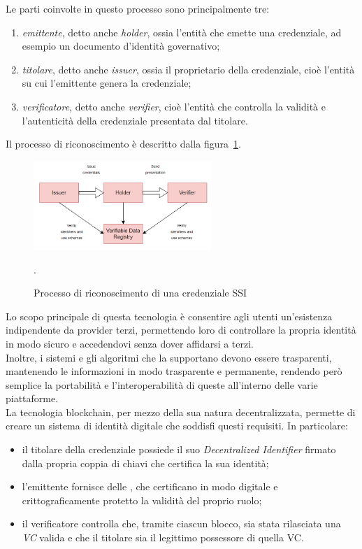 Le parti coinvolte in questo processo sono principalmente tre:
\begin{enumerate}
    \item {\textit{emittente}, detto anche \textit{holder}}, ossia l'entità che emette una credenziale, ad esempio un documento d'identità governativo;
    \item {\textit{titolare}, detto anche \textit{issuer}}, ossia il proprietario della credenziale, cioè l'entità su cui l'emittente genera la credenziale;
    \item {\textit{verificatore}, detto anche \textit{verifier}}, cioè l'entità che controlla la validità e l'autenticità della credenziale presentata dal titolare.
\end{enumerate}  

Il processo di riconoscimento è descritto dalla figura~\ref{fig:ssi}.

\begin{figure}[ht]
    \centering
    \includegraphics[width=0.6\textwidth, alt={Come funziona il riconoscimento nella SSI}]{immagini/ssi.png}
    \caption{Processo di riconoscimento di una credenziale SSI}\label{fig:ssi}.
\end{figure}

Lo scopo principale di questa tecnologia è consentire agli utenti un'esistenza indipendente da provider terzi, 
permettendo loro di controllare la propria identità in modo sicuro e accedendovi senza dover affidarsi a terzi. \\
Inoltre, i sistemi e gli algoritmi che la supportano devono essere trasparenti, mantenendo le informazioni in modo trasparente e permanente, rendendo però semplice 
la portabilità e l'interoperabilità di queste all'interno delle varie piattaforme. \\

La tecnologia blockchain, per mezzo della sua natura decentralizzata, permette di creare un sistema di identità digitale che soddisfi questi requisiti.
In particolare:
\begin{itemize}
    \item il titolare della credenziale possiede il suo \textit{Decentralized Identifier} firmato dalla propria coppia di chiavi che certifica la sua identità;
    \item l'emittente fornisce delle , che certificano in modo digitale e crittograficamente protetto la validità del proprio ruolo;
    \item il verificatore controlla che, tramite ciascun blocco, sia stata rilasciata una \textit{VC} valida e che il titolare sia il legittimo possessore di quella VC.\@
\end{itemize}  

